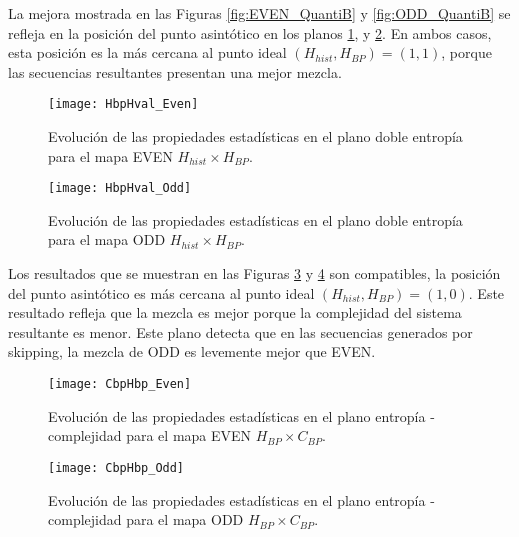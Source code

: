 La mejora mostrada en las Figuras \ref{fig:EVEN_QuantiB} y \ref{fig:ODD_QuantiB} se refleja en la posición del punto asintótico en los planos \ref{fig:EVEN_HH}, y \ref{fig:ODD_HH}.
En ambos casos, esta posición es la más cercana al punto ideal $(H_{hist}, H_{BP}) = (1, 1)$, porque las secuencias resultantes presentan una mejor mezcla.
%
\begin{figure}[htpb]
	\centering
	\texttt{[image: HbpHval\_Even]}
	\caption{Evolución de las propiedades estadísticas en el plano doble entropía para el mapa EVEN $H_{hist} \times H_{BP}$.}
	\label{fig:EVEN_HH}
\end{figure}
%
\begin{figure}[htpb]
	\centering
	\texttt{[image: HbpHval\_Odd]}
	\caption{Evolución de las propiedades estadísticas en el plano doble entropía para el mapa ODD $H_{hist} \times H_{BP}$.}
	\label{fig:ODD_HH}
\end{figure}

Los resultados que se muestran en las Figuras \ref{fig:EVEN_HC} y \ref{fig:ODD_HC} son compatibles, la posición del punto asintótico es más cercana al punto ideal $(H_{hist}, H_{BP}) = (1, 0)$.
Este resultado refleja que la mezcla es mejor porque la complejidad del sistema resultante es menor.
Este plano detecta que en las secuencias generados por skipping, la mezcla de ODD es levemente mejor que EVEN.
%
\begin{figure}[htpb]
	\centering
	\texttt{[image: CbpHbp\_Even]}
	\caption{Evolución de las propiedades estadísticas en el plano entropía - complejidad para el mapa EVEN $H_{BP} \times C_{BP}$.}
	\label{fig:EVEN_HC}
\end{figure}

\begin{figure}[htpb]
	\centering
	\texttt{[image: CbpHbp\_Odd]}
	\caption{Evolución de las propiedades estadísticas en el plano entropía - complejidad para el mapa ODD $H_{BP} \times C_{BP}$.}
	\label{fig:ODD_HC}
\end{figure}
